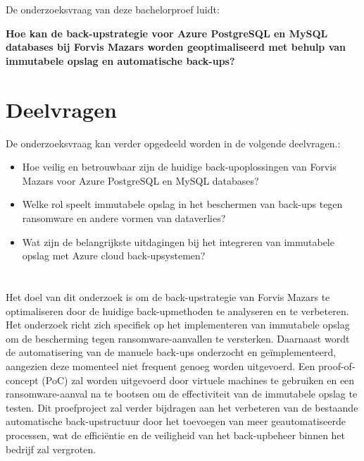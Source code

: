 \section{}%
\label{sec:onderzoeksvraag}

De onderzoeksvraag van deze bachelorproef luidt:

\textbf{Hoe kan de back-upstrategie voor Azure PostgreSQL en MySQL databases bij Forvis Mazars worden geoptimaliseerd met behulp van immutabele opslag en automatische back-ups?}

\section{Deelvragen}
De onderzoeksvraag kan verder opgedeeld worden in de volgende deelvragen.:
\begin{itemize}
    \item Hoe veilig en betrouwbaar zijn de huidige back-upoplossingen van Forvis Mazars voor Azure PostgreSQL en MySQL databases?
    \item Welke rol speelt immutabele opslag in het beschermen van back-ups tegen ransomware en andere vormen van dataverlies?
    \item Wat zijn de belangrijkste uitdagingen bij het integreren van immutabele opslag met Azure cloud back-upsystemen?
\end{itemize}

\section{}%
\label{sec:onderzoeksdoelstelling}

Het doel van dit onderzoek is om de back-upstrategie van Forvis Mazars te optimaliseren door de huidige back-upmethoden te analyseren en te verbeteren. Het onderzoek richt zich specifiek op het implementeren van immutabele opslag om de bescherming tegen ransomware-aanvallen te versterken. Daarnaast wordt de automatisering van de manuele back-ups onderzocht en geïmplementeerd, aangezien deze momenteel niet frequent genoeg worden uitgevoerd. Een proof-of-concept (PoC) zal worden uitgevoerd door virtuele machines te gebruiken en een ransomware-aanval na te bootsen om de effectiviteit van de immutabele opslag te testen. Dit proefproject zal verder bijdragen aan het verbeteren van de bestaande automatische back-upstructuur door het toevoegen van meer geautomatiseerde processen, wat de efficiëntie en de veiligheid van het back-upbeheer binnen het bedrijf zal vergroten.
